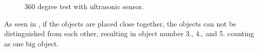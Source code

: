\begin{figure}[H]
     \caption{\label{fig:sonar-test-graph} 360 degree test with ultrasonic sensor.}
\end{figure}

As seen in , if the objects are placed close together, the objects can not be distinguished from each other, resulting in object number 3., 4., and 5. counting as one big object. 







